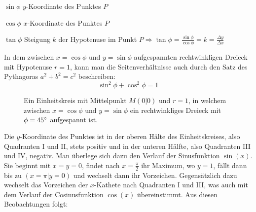 $\sin \phi$  $y$-Koordinate des Punktes $P$

$\cos \phi$  $x$-Koordinate des Punktes $P$

$\tan \phi$  Steigung $k$ der Hypotenuse im Punkt $P \Rightarrow \tan \phi = \frac{\sin \phi}{\cos \phi} = k = \frac{\Delta y}{\Delta x}$

In dem zwischen $x = \cos \phi$ und $y = \sin \phi$ aufgespannten rechtwinkligen Dreieck mit Hypotenuse $r = 1$, kann man die Seitenverh\"{a}ltnisse auch durch den Satz des Pythagoras $a^2 + b^2 = c^2$ beschreiben: $$\sin^2 \phi + \cos^2 \phi = 1$$

\pagebreak

\begin{figure}[t!]
\centering
	\caption*{Ein Einheitskreis mit Mittelpunkt $M (0 | 0)$ und $r = 1$, in welchem zwischen $x = \cos \phi$ und $y = \sin \phi$ ein rechtwinkliges Dreieck mit $\phi = 45\degree$ aufgespannt ist.}
\end{figure}

Die  $y$-Koordinate des Punktes ist in der oberen H\"{a}lte des Einheitskreises, also Quadranten I und II, stets positiv und in der unteren H\"{a}lfte, also Quadranten III und IV, negativ. Man \"{u}berlege sich dazu den Verlauf der Sinusfunktion $\sin(x)$. Sie beginnt mit $x = y = 0$, findet nach $x = \frac{\pi}{2}$ ihr Maximum, wo $y = 1$, f\"{a}llt dann bis zu $(x = \pi | y = 0)$ und wechselt dann ihr Vorzeichen. Gegens\"{a}tzlich dazu wechselt das Vorzeichen der $x$-Kathete nach Quadranten I und III, was auch mit dem Verlauf der Cosinusfunktion $\cos(x)$ \"{u}bereinstimmt. Aus diesen Beobachtungen folgt:

